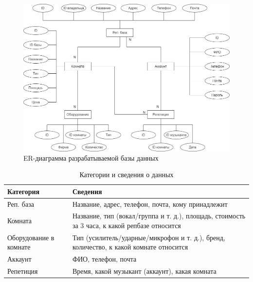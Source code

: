 \begin{figure}[h!]
	\begin{center}
		\includegraphics[scale=0.45]{inc/img/ER_Chena.png}
	\end{center}
	\captionsetup{justification=centering}
	\caption{ER-диаграмма разрабатываемой базы данных}
	\label{img:er-diagram}
\end{figure}

\begin{table}[!h]
	\captionsetup{justification=centering}
	\caption{\label{tab:data} Категории и сведения о данных}
	\begin{center}
		\begin{tabular}{|p{}|p{}|}
			\hline
			\textbf{Категория} & \textbf{Сведения}\\
			\hline
			Реп. база & Название, адрес, телефон, почта, кому принадлежит \\
			\hline
			Комната & Название, тип (вокал/группа и т. д.), площадь, стоимость за 3 часа, к какой репбазе относится \\
			\hline
			Оборудование в комнате & Тип (усилитель/ударные/микрофон и т. д.), бренд, количество, к какой комнате относится \\
			\hline
			Аккаунт & ФИО, телефон, почта \\
			\hline
			Репетиция & Время, какой музыкант (аккаунт), какая комната \\
			\hline
		\end{tabular}
	\end{center}
\end{table}

\newpage

